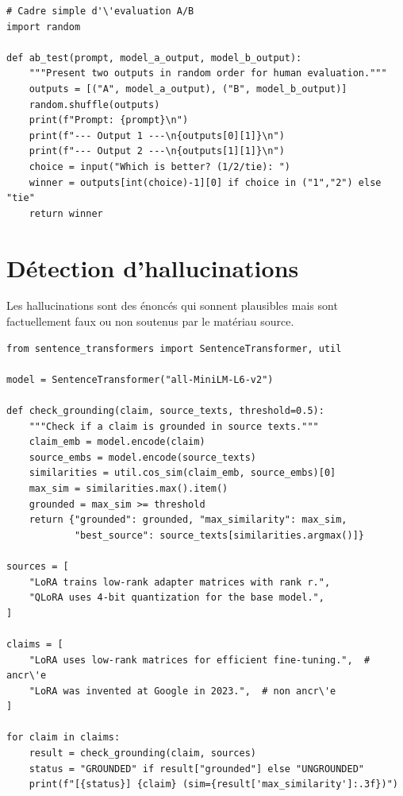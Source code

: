 \begin{verbatim}
# Cadre simple d'\'evaluation A/B
import random

def ab_test(prompt, model_a_output, model_b_output):
    """Present two outputs in random order for human evaluation."""
    outputs = [("A", model_a_output), ("B", model_b_output)]
    random.shuffle(outputs)
    print(f"Prompt: {prompt}\n")
    print(f"--- Output 1 ---\n{outputs[0][1]}\n")
    print(f"--- Output 2 ---\n{outputs[1][1]}\n")
    choice = input("Which is better? (1/2/tie): ")
    winner = outputs[int(choice)-1][0] if choice in ("1","2") else "tie"
    return winner
\end{verbatim}

\section{D\'etection d'hallucinations}

Les hallucinations sont des \'enonc\'es qui sonnent plausibles mais sont factuellement faux ou non soutenus par le mat\'eriau source.

\begin{verbatim}
from sentence_transformers import SentenceTransformer, util

model = SentenceTransformer("all-MiniLM-L6-v2")

def check_grounding(claim, source_texts, threshold=0.5):
    """Check if a claim is grounded in source texts."""
    claim_emb = model.encode(claim)
    source_embs = model.encode(source_texts)
    similarities = util.cos_sim(claim_emb, source_embs)[0]
    max_sim = similarities.max().item()
    grounded = max_sim >= threshold
    return {"grounded": grounded, "max_similarity": max_sim,
            "best_source": source_texts[similarities.argmax()]}

sources = [
    "LoRA trains low-rank adapter matrices with rank r.",
    "QLoRA uses 4-bit quantization for the base model.",
]

claims = [
    "LoRA uses low-rank matrices for efficient fine-tuning.",  # ancr\'e
    "LoRA was invented at Google in 2023.",  # non ancr\'e
]

for claim in claims:
    result = check_grounding(claim, sources)
    status = "GROUNDED" if result["grounded"] else "UNGROUNDED"
    print(f"[{status}] {claim} (sim={result['max_similarity']:.3f})")
\end{verbatim}

